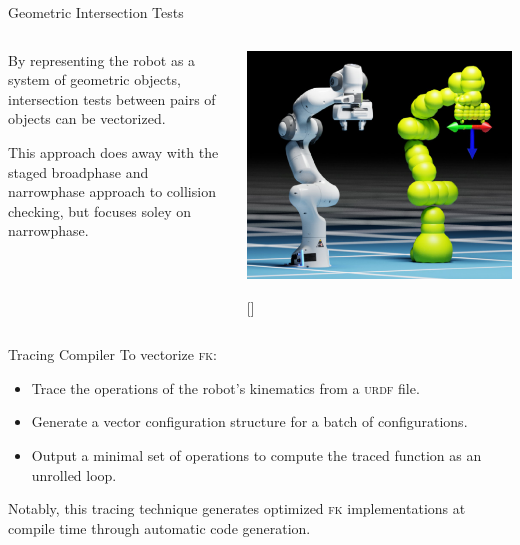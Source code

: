 \documentclass{beamer}
\begin{document}
\begin{frame}{Geometric Intersection Tests}
\begin{columns}
\begin{column}{0.5\textwidth}
By representing the robot as a system of geometric objects, intersection tests between pairs of objects can be vectorized.

\vspace{10px}

This approach does away with the staged broadphase and narrowphase approach to collision checking, but focuses soley on narrowphase.
\end{column}
\begin{column}{0.5\textwidth}
\includegraphics[width=\textwidth]{./assets/panda_spheres.png}

[\cite{paper:cuRobo}]
\end{column}
\end{columns}
\end{frame}

\begin{frame}{Tracing Compiler}
To vectorize \textsc{fk}:
\begin{itemize}
\item Trace the operations of the robot's kinematics from a \textsc{urdf} file.
\item Generate a vector configuration structure for a batch of configurations. 
\item Output a minimal set of operations to compute the traced function as an unrolled loop.
\end{itemize}

Notably, this tracing technique generates optimized \textsc{fk} implementations at compile time through automatic code generation.
\end{frame}
\end{document}
